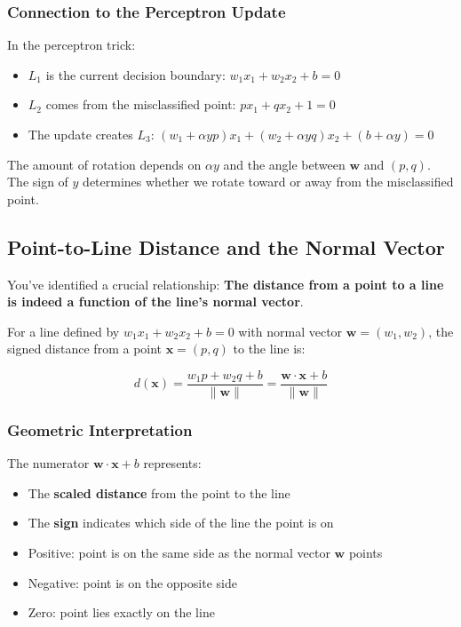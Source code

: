 \begin{notechapter}
\subsubsection{Connection to the Perceptron Update}

In the perceptron trick:
\begin{itemize}
    \item $L_1$ is the current decision boundary: $w_1 x_1 + w_2 x_2 + b = 0$
    \item $L_2$ comes from the misclassified point: $p x_1 + q x_2 + 1 = 0$
    \item The update creates $L_3$: $(w_1 + \alpha y p)x_1 + (w_2 + \alpha y q)x_2 + (b + \alpha y) = 0$
\end{itemize}

The amount of rotation depends on $\alpha y$ and the angle between $\mathbf{w}$ and $(p, q)$. The sign of $y$ determines whether we rotate toward or away from the misclassified point.

\subsection{Point-to-Line Distance and the Normal Vector}

You've identified a crucial relationship: \textbf{The distance from a point to a line is indeed a function of the line's normal vector}. 

For a line defined by $w_1x_1 + w_2x_2 + b = 0$ with normal vector $\mathbf{w} = (w_1, w_2)$, the signed distance from a point $\mathbf{x} = (p, q)$ to the line is:

\[
d(\mathbf{x}) = \frac{w_1p + w_2q + b}{\|\mathbf{w}\|} = \frac{\mathbf{w} \cdot \mathbf{x} + b}{\|\mathbf{w}\|}
\]

\subsubsection{Geometric Interpretation}

The numerator $\mathbf{w} \cdot \mathbf{x} + b$ represents:
\begin{itemize}
    \item The \textbf{scaled distance} from the point to the line
    \item The \textbf{sign} indicates which side of the line the point is on
    \item Positive: point is on the same side as the normal vector $\mathbf{w}$ points
    \item Negative: point is on the opposite side
    \item Zero: point lies exactly on the line
\end{itemize}


\end{notechapter}
